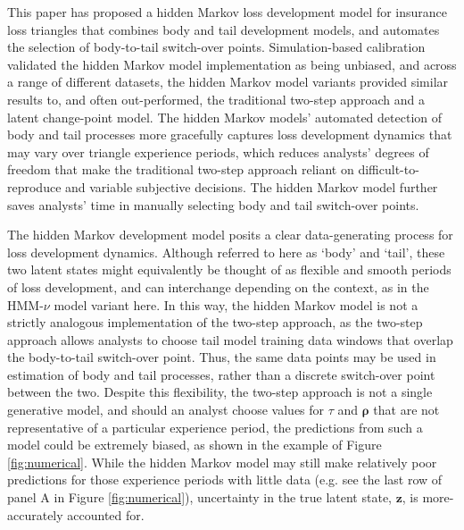 This paper has proposed
a hidden Markov loss development model
for insurance loss triangles that combines
body and tail development models,
and automates the selection of body-to-tail
switch-over points.
Simulation-based calibration validated
the hidden Markov model implementation
as being unbiased, and across
a range of different datasets,
the hidden Markov model variants
provided similar results to, 
and often out-performed,
the traditional two-step approach
and a latent change-point model.
The hidden Markov models'
automated detection
of body and tail processes
more gracefully captures
loss development dynamics
that may vary over triangle
experience periods, which
reduces analysts' degrees of freedom
that make the traditional
two-step approach reliant
on difficult-to-reproduce
and variable subjective
decisions. The hidden Markov
model further saves analysts'
time in manually selecting
body and tail switch-over points.

The hidden Markov development model 
posits a clear data-generating process for
loss development dynamics.
Although referred to here as `body' and `tail',
these two latent states might equivalently
be thought of as flexible and smooth
periods of loss development, and can interchange
depending on the context, as in the 
HMM-$\nu$ model variant here.
In this way, the hidden Markov model is not a strictly
analogous implementation of the two-step
approach,
as the two-step approach allows analysts
to choose tail model training data windows
that overlap the body-to-tail switch-over point.
Thus, the same data points may be used in
estimation of body and tail processes, rather
than a discrete switch-over point between the two.
Despite this flexibility, the two-step approach
is not a single generative model, and should an
analyst choose values for $\tau$ and $\bm{\rho}$
that are not representative of a particular
experience period, the predictions from
such a model could be extremely biased,
as shown in the example of Figure \ref{fig:numerical}.
While the hidden Markov model may still
make relatively poor predictions for those experience
periods with little data (e.g. see the last
row of panel A in Figure \ref{fig:numerical}),
uncertainty in the true latent state, $\bm{z}$,
is more-accurately accounted for.

